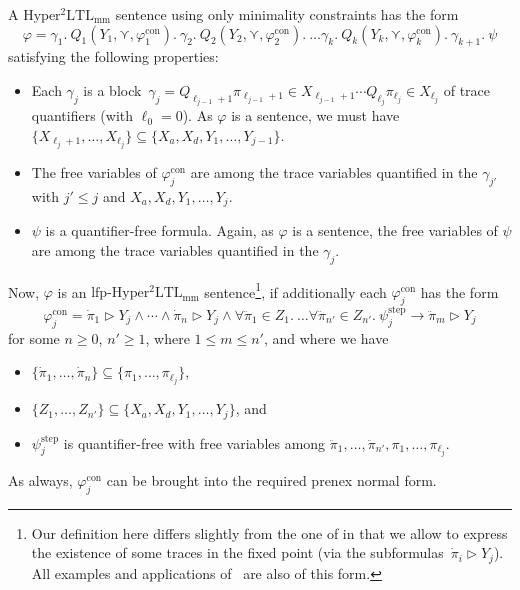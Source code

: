 \documentclass[dvipsnames,10pt,a4paper]{amsart}
\theoremstyle{definition}
\theoremstyle{remark}
\renewcommand{\phi}{\varphi}
\newcommand{\set}[1]{\{#1\}}
\newcommand{\sohyltlfp}{\mathrm{Hyper^2LTL_{\mathrm{mm}}}\xspace}
\newcommand{\lfpsohyltlfp}{\mathrm{lfp\text{-}{Hyper^2LTL_{\mathrm{mm}}}}\xspace}
\newcommand{\univar}{X_a}
\newcommand{\unidisvar}{X_d}
\newcommand{\smallest}{\curlyvee}
\newcommand{\con}{\mathrm{con}}
\newcommand{\step}{\mathrm{step}}
\newcommand{\tracein}{\mathrel{\triangleright}}
\newcommand{\quant}{Q}
\newcommand{\overdot}[1]{\dot{#1}}
\newcommand{\overdotdot}[1]{\ddot{#1}}
\begin{document}
A $\sohyltlfp$ sentence using only minimality constraints has the form 
\[
\phi = 
\gamma_1.\ \quant_1(Y_1, \smallest, \phi_1^\con).\ 
\gamma_2.\ \quant_2(Y_2, \smallest, \phi_2^\con).\ 
\ldots 
\gamma_k.\ \quant_k(Y_k, \smallest, \phi_k^\con).\
\gamma_{k+1}.\
\psi
\]
satisfying the following properties: 
\begin{itemize}
    \item Each $\gamma_j$ is a block~$
    \gamma_j = \quant_{\ell_{j-1}+1} \pi_{\ell_{j-1}+1} \in X_{\ell_{j-1}+1} \cdots \quant_{\ell_{j}} \pi_{\ell_{j}} \in X_{\ell_{j}} 
    $
    of trace quantifiers (with $\ell_0 = 0$). As $\phi$ is a sentence, we must have $\set{X_{\ell_j+1}, \ldots, X_{\ell_{j}}} \subseteq \set{\univar,\unidisvar, Y_1, \ldots, Y_{j-1}}$.

    \item The free variables of $\phi_j^\con$ are among the trace variables quantified in the $\gamma_{j'}$ with $j' \le j$ and $\univar,\unidisvar, Y_1, \ldots, Y_j$.
    
    \item $\psi$ is a quantifier-free formula. Again, as $\phi$ is a sentence, the free variables of $\psi$ are among the trace variables quantified in the $\gamma_j$.
\end{itemize}

Now, $\phi$ is an $\lfpsohyltlfp$ sentence\footnote{Our definition here differs slightly from the one of  \cite{DBLP:conf/cav/BeutnerFFM23} in that we allow to express the existence of some traces in the fixed point (via the subformulas~$\overdot{\pi}_i\tracein Y_j$). All examples and applications of~\cite{DBLP:conf/cav/BeutnerFFM23} are also of this form.}, if additionally each $\phi_j^\con$ has the form 
    \[ \phi_j^\con = \overdot{\pi}_1\tracein Y_j \wedge \cdots \wedge \overdot{\pi}_n \tracein Y_j \wedge   \forall \overdotdot{\pi}_1 \in Z_1.\ \ldots \forall \overdotdot{\pi}_{n'} \in Z_{n'}.\ \psi^\step_j \rightarrow \overdotdot{\pi}_m \tracein Y_j \]
 for some $n\ge 0$, $n' \ge 1$, where $1 \le m \le {n'}$, and where we have
\begin{itemize}
    \item $\set{\overdot{\pi}_1,\ldots, \overdot{\pi}_n} \subseteq \set{\pi_1, \ldots, \pi_{\ell_j} }$,
    \item $\set{Z_1, \ldots, Z_{n'}} \subseteq \set{\univar, \unidisvar, Y_1, \ldots, Y_j}$, and
    \item $\psi^\step_j$ is quantifier-free with free variables among $\overdotdot{\pi}_1, \ldots, \overdotdot{\pi}_{n'}, \pi_1, \ldots, \pi_{\ell_j}$.
\end{itemize} 
As always, $\phi_j^\con$ can be brought into the required prenex normal form.
\end{document}
